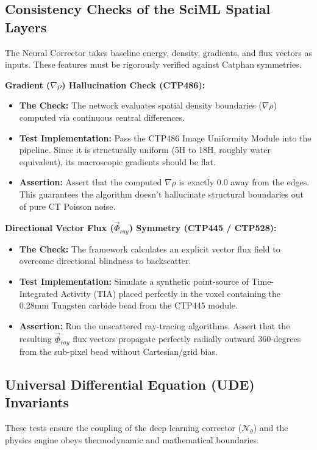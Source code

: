 \documentclass[11pt,a4paper]{article}
\begin{document}
\subsection{Consistency Checks of the SciML Spatial Layers}
The Neural Corrector takes baseline energy, density, gradients, and flux vectors as inputs. These features must be rigorously verified against Catphan symmetries.

\noindent\textbf{Gradient ($\nabla\rho$) Hallucination Check (CTP486):}
\begin{itemize}
    \item \textbf{The Check:} The network evaluates spatial density boundaries ($\nabla\rho$) computed via continuous central differences.
    \item \textbf{Test Implementation:} Pass the CTP486 Image Uniformity Module into the pipeline. Since it is structurally uniform (5H to 18H, roughly water equivalent), its macroscopic gradients should be flat.
    \item \textbf{Assertion:} Assert that the computed $\nabla\rho$ is exactly $0.0$ away from the edges. This guarantees the algorithm doesn't hallucinate structural boundaries out of pure CT Poisson noise.
\end{itemize}

\noindent\textbf{Directional Vector Flux ($\vec{\Phi}_{ray}$) Symmetry (CTP445 / CTP528):}
\begin{itemize}
    \item \textbf{The Check:} The framework calculates an explicit vector flux field to overcome directional blindness to backscatter.
    \item \textbf{Test Implementation:} Simulate a synthetic point-source of Time-Integrated Activity (TIA) placed perfectly in the voxel containing the 0.28mm Tungsten carbide bead from the CTP445 module.
    \item \textbf{Assertion:} Run the unscattered ray-tracing algorithms. Assert that the resulting $\vec{\Phi}_{ray}$ flux vectors propagate perfectly radially outward 360-degrees from the sub-pixel bead without Cartesian/grid bias.
\end{itemize}

\subsection{Universal Differential Equation (UDE) Invariants}
These tests ensure the coupling of the deep learning corrector ($\mathcal{N}_\theta$) and the physics engine obeys thermodynamic and mathematical boundaries.
\end{document}
